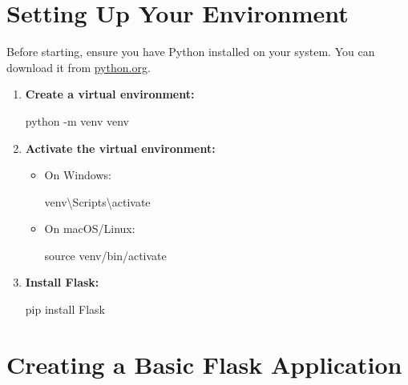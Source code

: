\documentclass[
  letterpaper,
  DIV=11,
  numbers=noendperiod]{scrreprt}
\newenvironment{Shaded}{\begin{snugshade}}{\end{snugshade}}
\newcommand{\AttributeTok}[1]{\textcolor[rgb]{0.40,0.45,0.13}{#1}}
\newcommand{\BuiltInTok}[1]{\textcolor[rgb]{0.00,0.23,0.31}{#1}}
\newcommand{\ExtensionTok}[1]{\textcolor[rgb]{0.00,0.23,0.31}{#1}}
\newcommand{\NormalTok}[1]{\textcolor[rgb]{0.00,0.23,0.31}{#1}}
\begin{document}
\section{Setting Up Your
Environment}\label{setting-up-your-environment-1}

Before starting, ensure you have Python installed on your system. You
can download it from \href{https://www.python.org/}{python.org}.

\begin{enumerate}
\def\labelenumi{\arabic{enumi}.}
\item
  \textbf{Create a virtual environment:}

\begin{Shaded}
\begin{Highlighting}[]
\ExtensionTok{python} \AttributeTok{{-}m}\NormalTok{ venv venv}
\end{Highlighting}
\end{Shaded}
\item
  \textbf{Activate the virtual environment:}

  \begin{itemize}
  \item
    On Windows:

\begin{Shaded}
\begin{Highlighting}[]
\ExtensionTok{venv\textbackslash{}Scripts\textbackslash{}activate}
\end{Highlighting}
\end{Shaded}
  \item
    On macOS/Linux:

\begin{Shaded}
\begin{Highlighting}[]
\BuiltInTok{source}\NormalTok{ venv/bin/activate}
\end{Highlighting}
\end{Shaded}
  \end{itemize}
\item
  \textbf{Install Flask:}

\begin{Shaded}
\begin{Highlighting}[]
\ExtensionTok{pip}\NormalTok{ install Flask}
\end{Highlighting}
\end{Shaded}
\end{enumerate}

\section{Creating a Basic Flask
Application}\label{creating-a-basic-flask-application}
\end{document}
